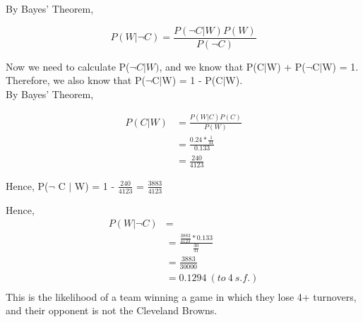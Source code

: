\documentclass{article}
\newcommand\ddfrac[2]{\frac{\displaystyle #1}{\displaystyle #2}}
\begin{document}
By Bayes' Theorem, 

$$P(W|\lnot C) = \ddfrac{P(\lnot C|W)P(W)}{P(\lnot C)}$$

Now we need to calculate P($\lnot C|W)$, and we know that P(C$|$W) + P($\lnot$C$|$W) = 1. Therefore, we also know that P($\lnot$C$|$W) = 1 - P(C$|$W). \\

By Bayes' Theorem,

\begin{align*}
P(C|W) &= \ddfrac{P(W|C)P(C)}{P(W)} \\
       &= \ddfrac{0.24 * \ddfrac{1}{31}}{0.133} \\
       &= \ddfrac{240}{4123}
\end{align*}

Hence, P($\lnot$ C $|$ W) = 1 - $\ddfrac{240}{4123}$ = $\ddfrac{3883}{4123}$

Hence, 
\begin{align*}
P(W|\lnot C) &=  \\
		       &= \ddfrac{\ddfrac{3883}{4123} * 0.133}{\ddfrac{30}{31}} \\       
		       &= \ddfrac{3883}{30000}  \\       
		       &= 0.1294\ (to\ 4\ s.f.) \\
\end{align*}
This is the likelihood of a team winning a game in which they lose 4+ turnovers, and their opponent is not the Cleveland Browns.
\end{document}
